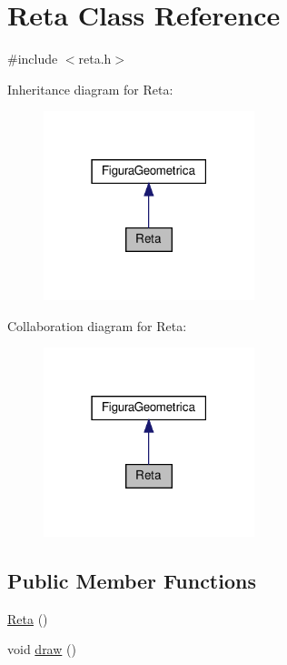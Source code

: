 \hypertarget{class_reta}{}\section{Reta Class Reference}
\label{class_reta}


{\ttfamily \#include $<$reta.\+h$>$}



Inheritance diagram for Reta\+:
\nopagebreak
\begin{figure}[H]
\begin{center}
\leavevmode
\includegraphics[width=174pt]{class_reta__inherit__graph}
\end{center}
\end{figure}


Collaboration diagram for Reta\+:
\nopagebreak
\begin{figure}[H]
\begin{center}
\leavevmode
\includegraphics[width=174pt]{class_reta__coll__graph}
\end{center}
\end{figure}
\subsection*{Public Member Functions}
\begin{DoxyCompactItemize}
\item 
\hyperlink{class_reta_ab4754dffc985acd6cf4eec6f9bac668a}{Reta} ()
\item 
void \hyperlink{class_reta_a1c370279480f421bf617e5fbfbbb63a1}{draw} ()
\end{DoxyCompactItemize}


